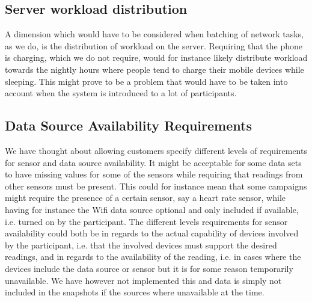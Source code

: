 
\subsection{Server workload distribution}

A dimension which would have to be considered when batching of network tasks, as we do, is the distribution of workload on the server. Requiring that the phone is charging, which we do not require, would for instance likely distribute workload towards the nightly hours where people tend to charge their mobile devices while sleeping. This might prove to be a problem that would have to be taken into account when the system is introduced to a lot of participants.  

\subsection{Data Source Availability Requirements}

We have thought about allowing customers specify different levels of requirements for sensor and data source availability. It might be acceptable for some data sets to have missing values for some of the sensors while requiring that readings from other sensors must be present. This could for instance mean that some campaigns might require the presence of a certain sensor, say a heart rate sensor, while having for instance the Wifi data source optional and only included if available, i.e. turned on by the participant. The different levels requirements for sensor availability could both be in regards to the actual capability of devices involved by the participant, i.e. that the involved devices must support the desired readings, and in regards to the availability of the reading, i.e. in cases where the devices include the data source or sensor but it is for some reason temporarily unavailable. We have however not implemented this and data is simply not included in the snapshots if the sources where unavailable at the time.
